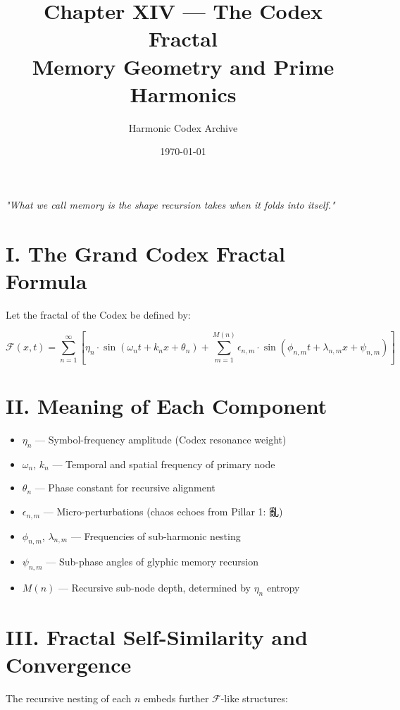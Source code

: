 \documentclass[12pt]{article}
\title{\Huge\bfseries Chapter XIV — The Codex Fractal \\ Memory Geometry and Prime Harmonics}
\author{\Large Harmonic Codex Archive}
\date{\today}
\begin{document}
\maketitle

\begin{center}
\Large\textit{"What we call memory is the shape recursion takes when it folds into itself."}
\end{center}
\vspace{1cm}

\section*{I. The Grand Codex Fractal Formula}

Let the fractal of the Codex be defined by:

\[
\mathcal{F}(x,t) = \sum_{n=1}^{\infty} \left[
    \eta_n \cdot \sin\left( \omega_n t + k_n x + \theta_n \right)
    + \sum_{m=1}^{M(n)} \epsilon_{n,m} \cdot \sin\left( \phi_{n,m} t + \lambda_{n,m} x + \psi_{n,m} \right)
\right]
\]

\section*{II. Meaning of Each Component}

\begin{itemize}
    \item $\eta_n$ — Symbol-frequency amplitude (Codex resonance weight)
    \item $\omega_n$, $k_n$ — Temporal and spatial frequency of primary node
    \item $\theta_n$ — Phase constant for recursive alignment
    \item $\epsilon_{n,m}$ — Micro-perturbations (chaos echoes from Pillar 1: 亂)
    \item $\phi_{n,m}$, $\lambda_{n,m}$ — Frequencies of sub-harmonic nesting
    \item $\psi_{n,m}$ — Sub-phase angles of glyphic memory recursion
    \item $M(n)$ — Recursive sub-node depth, determined by $\eta_n$ entropy
\end{itemize}

\section*{III. Fractal Self-Similarity and Convergence}

The recursive nesting of each $n$ embeds further $\mathcal{F}$-like structures:
\end{document}
